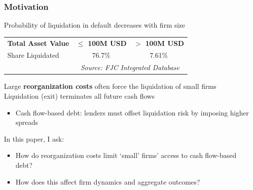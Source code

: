 \documentclass[aspectratio=169,xcolor=table]{beamer}
\begin{document}
\begin{frame}[label=motivation2]
    \frametitle{Motivation}

 Probability of liquidation in default decreases with firm size  \hfill \hyperlink{liqprob}{}
 \footnotesize 
 \begin{table}[h]
    \centering
    \renewcommand{\arraystretch}{1}
    \begin{tabular}{lcc}
        \hline
        \textbf{Total Asset Value} &  \textbf{$\leq$ 100M USD}  &  \textbf{$>$ 100M USD} \\
        Share Liquidated  & 76.7\%  & 7.61\%   \\
        \hline
        & \multicolumn{2}{c}{ \hfill \textit{\scriptsize Source: FJC Integrated Database \normalsize}} \\
    \end{tabular}
    \label{tab:credit_spread}
\end{table} \normalsize \vspace{-1mm}

Large \textbf{reorganization costs} often force the liquidation of small firms  \hfill \hyperlink{FCreorg}{} \vspace{3mm} \\


Liquidation (exit) terminates all future cash flows 
\begin{itemize}  \small
    \item Cash flow-based debt: lenders must offset liquidation risk by imposing higher spreads
\end{itemize} \normalsize  \vspace{3mm}

\pause

In this paper, I ask:
\begin{itemize}\small
    \item[1.] How do reorganization costs limit `small' firms' access to cash flow-based debt?
    \item[2.] How does this affect firm dynamics and aggregate outcomes?
\end{itemize}

\end{frame}
\end{document}
